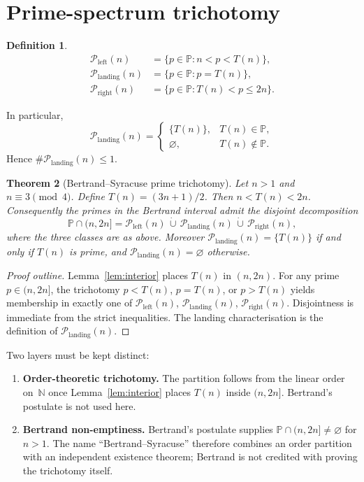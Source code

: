 \documentclass[11pt,a4paper]{article}
\newtheorem{theorem}{Theorem}
\theoremstyle{definition}
\newtheorem{definition}[theorem]{Definition}
\theoremstyle{remark}
\newcommand{\TT}{T}
\newcommand{\Pleft}{\mathcal{P}_{\mathrm{left}}}
\newcommand{\Pland}{\mathcal{P}_{\mathrm{landing}}}
\newcommand{\Pright}{\mathcal{P}_{\mathrm{right}}}
\begin{document}
\section{Prime-spectrum trichotomy}

\begin{definition}
\[
\begin{aligned}
\Pleft(n)
&=\{p\in\mathbb{P}: n<p<\TT(n)\},\\
\Pland(n)
&=\{p\in\mathbb{P}: p=\TT(n)\},\\
\Pright(n)
&=\{p\in\mathbb{P}: \TT(n)<p\le 2n\}.
\end{aligned}
\]
\end{definition}
In particular,
\[
\Pland(n)
=
\begin{cases}
\{\TT(n)\}, & \TT(n)\in\mathbb{P},\\
\varnothing, & \TT(n)\notin\mathbb{P}.
\end{cases}
\]
Hence $\#\Pland(n)\le 1$.

\begin{theorem}[Bertrand--Syracuse prime trichotomy]
\label{thm:main}
Let $n>1$ and $n\equiv 3\pmod{4}$. Define $\TT(n)=(3n+1)/2$.
Then $n<\TT(n)<2n$. Consequently the primes in the Bertrand interval admit
the disjoint decomposition
\[
\mathbb{P}\cap(n,2n]
=
\Pleft(n)
\,\dot\cup\,
\Pland(n)
\,\dot\cup\,
\Pright(n),
\]
where the three classes are as above.
Moreover $\Pland(n)=\{\TT(n)\}$ if and only if $\TT(n)$ is prime, and
$\Pland(n)=\varnothing$ otherwise.
\end{theorem}
\begin{proof}[Proof outline]
Lemma~\ref{lem:interior} places $\TT(n)$ in $(n,2n)$. For any prime
$p\in(n,2n]$, the trichotomy $p<\TT(n)$, $p=\TT(n)$, or $p>\TT(n)$ yields
membership in exactly one of $\Pleft(n)$, $\Pland(n)$, $\Pright(n)$.
Disjointness is immediate from the strict inequalities. The landing
characterisation is the definition of $\Pland(n)$.
\end{proof}

Two layers must be kept distinct:
\begin{enumerate}[leftmargin=*]
  \item \textbf{Order-theoretic trichotomy.} The partition follows from the
  linear order on~$\mathbb{N}$ once Lemma~\ref{lem:interior} places
  $\TT(n)$ inside $(n,2n]$. Bertrand's postulate is not used here.
  \item \textbf{Bertrand non-emptiness.} Bertrand's postulate supplies
  $\mathbb{P}\cap(n,2n]\neq\varnothing$ for $n>1$. The name
  ``Bertrand--Syracuse'' therefore combines an order partition with an
  independent existence theorem; Bertrand is not credited with proving the
  trichotomy itself.
\end{enumerate}
\end{document}
